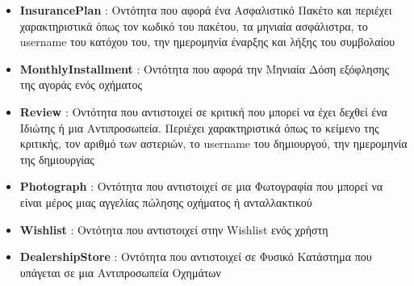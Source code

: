 \documentclass{../ol-softwaremanual}
\begin{document}
\begin{itemize}
		\item \en \textbf{InsurancePlan} \gr : Οντότητα που αφορά ένα Ασφαλιστικό Πακέτο και περιέχει χαρακτηριστικά όπως τον κωδικό του πακέτου, τα μηνιαία ασφάλιστρα, το \en username \gr του κατόχου του, την ημερομηνία έναρξης και λήξης του συμβολαίου
		\item \en \textbf{MonthlyInstallment} \gr : Οντότητα που αφορά την Μηνιαία Δόση εξόφλησης της αγοράς ενός οχήματος
		\item \en \textbf{Review} \gr : Οντότητα που αντιστοιχεί σε κριτική που μπορεί να έχει δεχθεί ένα Ιδιώτης ή μια Αντιπροσωπεία. Περιέχει χαρακτηριστικά όπως το κείμενο της κριτικής, τον αριθμό των αστεριών, το \en username \gr του δημιουργού, την ημερομηνία της δημιουργίας
		\item \en \textbf{Photograph} \gr : Οντότητα που αντιστοιχεί σε μια Φωτογραφία που μπορεί να είναι μέρος μιας αγγελίας πώλησης οχήματος ή ανταλλακτικού
		\item \en \textbf{Wishlist} \gr : Οντότητα που αντιστοιχεί στην \en Wishlist \gr ενός χρήστη
		\item \en \textbf{DealershipStore} \gr : Οντότητα που αντιστοιχεί σε Φυσικό Κατάστημα που υπάγεται σε μια Αντιπροσωπεία Οχημάτων		
	\end{itemize}
	
	
	

	
\end{document}
